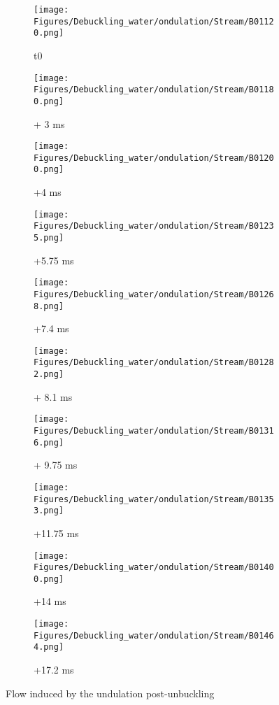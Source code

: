 \documentclass[a4paper,10pt]{report}
\begin{document}
\begin{figure}[htbp]%
	\centering%
	 \begin{subfigure}[h]{0.25\textwidth}%
        \texttt{[image: Figures/Debuckling\_water/ondulation/Stream/B01120.png]}%
        \caption{t0}%
				\label{fig:t0}%
    \end{subfigure}%
		\begin{subfigure}[h]{0.25\textwidth}%
        \texttt{[image: Figures/Debuckling\_water/ondulation/Stream/B01180.png]}%
        \caption{+ 3 ms}%
				\label{fig:3ms}%
    \end{subfigure}%
		\begin{subfigure}[h]{0.25\textwidth}%
        \texttt{[image: Figures/Debuckling\_water/ondulation/Stream/B01200.png]}%
        \caption{+4 ms}%
				\label{fig:4ms}%
    \end{subfigure}%
		\begin{subfigure}[h]{0.25\textwidth}%
        \texttt{[image: Figures/Debuckling\_water/ondulation/Stream/B01235.png]}%
        \caption{+5.75 ms}%
				\label{fig:6ms}%
    \end{subfigure}%
		
		\begin{subfigure}[h]{0.25\textwidth}%
        \texttt{[image: Figures/Debuckling\_water/ondulation/Stream/B01268.png]}%
        \caption{+7.4 ms}%
				\label{fig:7ms}%
    \end{subfigure}%
		\begin{subfigure}[h]{0.25\textwidth}%
        \texttt{[image: Figures/Debuckling\_water/ondulation/Stream/B01282.png]}%
        \caption{+ 8.1 ms}%
				\label{fig:8ms}%
    \end{subfigure}%
		\begin{subfigure}[h]{0.25\textwidth}%
        \texttt{[image: Figures/Debuckling\_water/ondulation/Stream/B01316.png]}%
        \caption{+ 9.75 ms}%
				\label{fig:10ms}%
    \end{subfigure}%
		\begin{subfigure}[h]{0.25\textwidth}%
        \texttt{[image: Figures/Debuckling\_water/ondulation/Stream/B01353.png]}%
        \caption{+11.75 ms}%
				\label{fig:12ms}%
    \end{subfigure}%
		
		\begin{subfigure}[h]{0.25\textwidth}%
        \texttt{[image: Figures/Debuckling\_water/ondulation/Stream/B01400.png]}%
        \caption{+14 ms}%
				\label{fig:14ms}%
    \end{subfigure}%
		\begin{subfigure}[h]{0.25\textwidth}%
        \texttt{[image: Figures/Debuckling\_water/ondulation/Stream/B01464.png]}%
        \caption{+17.2 ms}%
				\label{fig:17ms}%
    \end{subfigure}%
		\caption{Flow induced by the undulation post-unbuckling}%
		\label{fig:FlowOndulationpostunbuckling}%
\end{figure}
\end{document}
